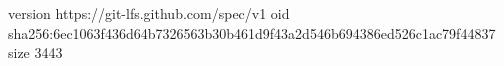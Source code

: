 version https://git-lfs.github.com/spec/v1
oid sha256:6ec1063f436d64b7326563b30b461d9f43a2d546b694386ed526c1ac79f44837
size 3443

